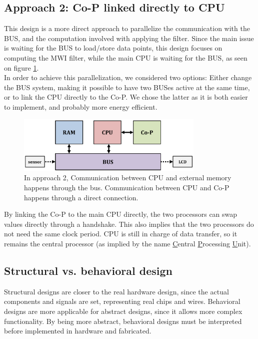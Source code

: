 \subsection{Approach 2: Co-P linked directly to CPU}

This design is a more direct approach to parallelize the communication with the BUS, and the computation involved with applying the filter. Since the main issue is waiting for the BUS to load/store data points, this design focuses on computing the MWI filter, while the main CPU is waiting for the BUS, as seen on figure \ref{fig:designBus2}. \\

In order to achieve this parallelization, we considered two options: Either change the BUS system, making it possible to have two BUSes active at the same time, or to link the CPU directly to the Co-P. We chose the latter as it is both easier to implement, and probably more energy efficient.

\begin{figure}[H]
    \centering
    \includegraphics[width=0.8\textwidth]{1Design/fig/designBus2.pdf}
    \caption{In approach 2, Communication between CPU and external memory happens through the bus. Communication between CPU and Co-P happens through a direct connection.}
    \label{fig:designBus2}
\end{figure}

By linking the Co-P to the main CPU directly, the two processors can swap values directly through a handshake. This also implies that the two processors do not need the same clock period. CPU is still in charge of data transfer, so it remains the central processor (as implied by the name \underline{C}entral \underline{P}rocessing \underline{U}nit).

\subsection{Structural vs. behavioral design}\label{sec:structuralOrBehavioralDesign}

Structural designs are closer to the real hardware design, since the actual components and signals are set, representing real chips and wires. Behavioral designs are more applicable for abstract designs, since it allows more complex functionality. By being more abstract, behavioral designs must be interpreted before implemented in hardware and fabricated.\\

